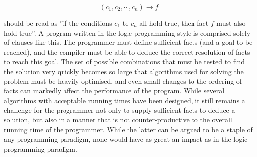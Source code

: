 \[
(c_1, c_2, \cdots , c_n) \rightarrow f
\]

should be read as ''if the conditions $c_1$ to $c_n$ all hold true, then fact $f$ must also hold true''. A program written in the logic programming style is comprised solely of clauses like this. The programmer must define sufficient facts (and a goal to be reached), and the compiler must be able to deduce the correct resolution of facts to reach this goal. The set of possible combinations that must be tested to find the solution very quickly becomes so large that algorithms used for solving the problem must be heavily optimised, and even small changes to the ordering of facts can markedly affect the performance of the program. While several algorithms with acceptable running times have been designed, it still remains a challenge for the programmer not only to supply sufficient facts to deduce a solution, but also in a manner that is not counter-productive to the overall running time of the programmer. While the latter can be argued to be a staple of any programming paradigm, none would have as great an impact as in the logic programming paradigm.